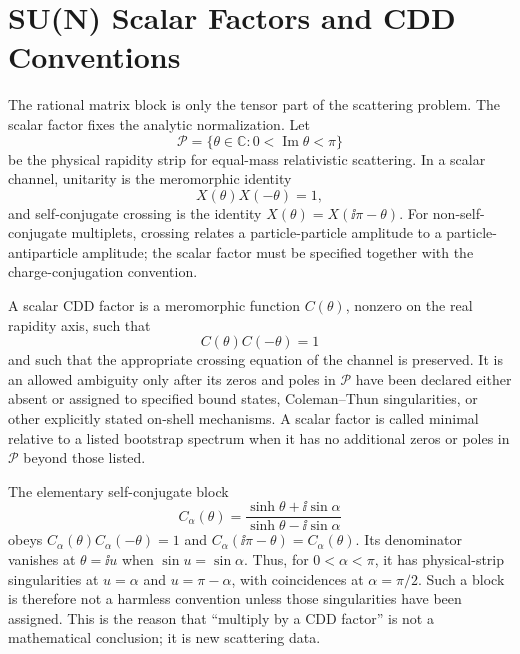 \section{SU(N) Scalar Factors and CDD Conventions}
\label{sec:su-n-scalar-factors-cdd}

The rational matrix block is only the tensor part of the scattering problem.
The scalar factor fixes the analytic normalization.  Let
\[
  \mathcal P=\{\theta\in\mathbb C:0<\operatorname{Im}\theta<\pi\}
\]
be the physical rapidity strip for equal-mass relativistic scattering.  In a
scalar channel, unitarity is the meromorphic identity
\[
  X(\theta)X(-\theta)=1,
\]
and self-conjugate crossing is the identity \(X(\theta)=X(\ii\pi-\theta)\).
For non-self-conjugate multiplets, crossing relates a particle-particle
amplitude to a particle-antiparticle amplitude; the scalar factor must be
specified together with the charge-conjugation convention.

\begin{definition}
\label{def:cdd-factor-one-channel}
A scalar CDD factor is a meromorphic function \(C(\theta)\), nonzero on the
real rapidity axis, such that
\[
  C(\theta)C(-\theta)=1
\]
and such that the appropriate crossing equation of the channel is preserved.
It is an allowed ambiguity only after its zeros and poles in
\(\mathcal P\) have been declared either absent or assigned to specified
bound states, Coleman--Thun singularities, or other explicitly stated
on-shell mechanisms.  A scalar factor is called minimal relative to a listed
bootstrap spectrum when it has no additional zeros or poles in
\(\mathcal P\) beyond those listed.
\end{definition}

The elementary self-conjugate block
\begin{equation}
  C_\alpha(\theta)
  =
  \frac{\sinh\theta+\ii\sin\alpha}
       {\sinh\theta-\ii\sin\alpha}
  \label{eq:elementary-cdd-block}
\end{equation}
obeys \(C_\alpha(\theta)C_\alpha(-\theta)=1\) and
\(C_\alpha(\ii\pi-\theta)=C_\alpha(\theta)\).  Its denominator vanishes at
\(\theta=\ii u\) when \(\sin u=\sin\alpha\).  Thus, for
\(0<\alpha<\pi\), it has physical-strip singularities at
\(u=\alpha\) and \(u=\pi-\alpha\), with coincidences at
\(\alpha=\pi/2\).  Such a block is therefore not a harmless convention unless
those singularities have been assigned.  This is the reason that ``multiply
by a CDD factor'' is not a mathematical conclusion; it is new scattering
data.

